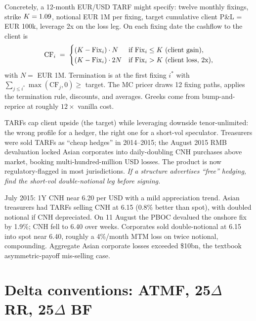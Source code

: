 Concretely, a 12-month EUR/USD TARF might specify: twelve monthly
fixings, strike $K = 1.09$, notional EUR 1M per fixing,
target cumulative client P\&L = EUR 100k, leverage 2x on the loss
leg.  On each fixing date the cashflow to the client is
\begin{equation}
  \mathrm{CF}_i \;=\;
  \begin{cases}
    (K - \mathrm{Fix}_i) \cdot N
      & \text{if } \mathrm{Fix}_i \leq K \ \text{(client gain)}, \\
    (K - \mathrm{Fix}_i) \cdot 2N
      & \text{if } \mathrm{Fix}_i > K \ \text{(client loss, 2x)},
  \end{cases}
\end{equation}
with $N = $ EUR 1M.  Termination is at the first fixing $i^*$ with
$\sum_{j \leq i^*} \max(\mathrm{CF}_j, 0) \geq $ target.  The MC
pricer draws 12 fixing paths, applies the termination rule,
discounts, and averages.  Greeks come from bump-and-reprice at
roughly $12\times$ vanilla cost.

\begin{pitfallbox}
TARFs cap client upside (the target) while leveraging downside
tenor-unlimited: the wrong profile for a hedger, the right one
for a short-vol speculator.  Treasurers were sold TARFs as ``cheap
hedges'' in 2014--2015; the August 2015 RMB devaluation locked
Asian corporates into daily-doubling CNH purchases above market,
booking multi-hundred-million USD losses.  The product is now
regulatory-flagged in most jurisdictions.  \emph{If a structure
advertises ``free'' hedging, find the short-vol double-notional
leg before signing.}
\end{pitfallbox}

\begin{historybox}[title={The 2015 CNH TARF blow-up}]
July 2015: 1Y CNH near 6.20 per USD with a mild appreciation
trend.  Asian treasurers had TARFs selling CNH at 6.15 (0.8\% better
than spot), with doubled notional if CNH depreciated.  On 11 August
the PBOC devalued the onshore fix by 1.9\%; CNH fell to 6.40 over
weeks.  Corporates sold double-notional at 6.15 into spot near 6.40,
roughly a 4\%/month MTM loss on twice notional, compounding.
Aggregate Asian corporate losses exceeded \$10bn, the textbook
asymmetric-payoff mis-selling case.
\end{historybox}


\section{Delta conventions: ATMF, 25\texorpdfstring{$\Delta$}{-delta} RR, 25\texorpdfstring{$\Delta$}{-delta} BF}
\label{sec:fx_delta_conventions}

